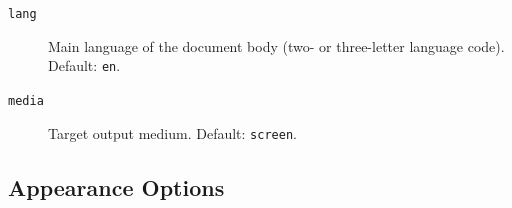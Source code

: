 \begin{description}
  \item[\texttt{lang}] Main language of the document body (two- or
    three-letter language code).  Default: \texttt{en}.
\begin{latexcode}
\end{latexcode}

  \item[\texttt{media}] Target output medium.  Default: \texttt{screen}.
\begin{latexcode}
\end{latexcode}
\end{description}

\subsection{Appearance Options}
\label{sub:appearance_options}

